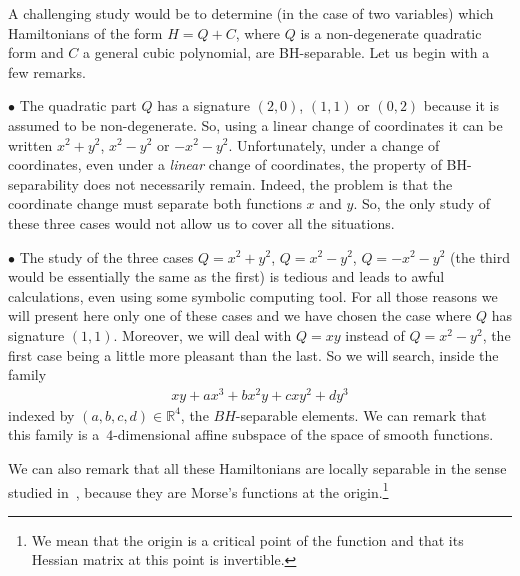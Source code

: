 \documentclass[10pt,a4paper]{amsart}
\numberwithin{equation}{section}
\begin{document}
A challenging study would be to determine (in the case of two variables) which Hamiltonians of the form $H=Q+C$, where $Q$ is a non-degenerate quadratic form and $C$ a general cubic polynomial, are BH-separable.
Let us begin with a few remarks.



$\bullet$ The quadratic part $Q$ has a signature $(2,0)$, $(1,1)$ or $(0,2)$ because it is assumed to be non-degenerate. So, using a linear change of coordinates it can be written $x^2+y^2$, $x^2-y^2$ or $-x^2-y^2$. Unfortunately, under a change of coordinates, even under a {\it linear} change of coordinates, the property of BH-separability does not necessarily remain. Indeed, the problem is that the coordinate change must separate both functions $x$ and $y$. So, the only study of these three cases would not allow us to cover all the situations.

$\bullet$ The study of the three cases $Q=x^2+y^2$, $Q=x^2-y^2$, $Q=-x^2-y^2$ (the third would be essentially the same as the first) is tedious and leads to awful calculations, even using some symbolic computing tool. For all those reasons we will present here only one of these cases and we have chosen the case where $Q$ has signature $(1,1)$. Moreover, we will deal with $Q=xy$ instead of $Q=x^2-y^2$, the first case being a little more pleasant than the last.
So we will search, inside the family
\begin{gather*}
xy+ax^3+bx^2y+cxy^2+dy^3
\end{gather*}
indexed by $(a,b,c,d)\in\mathbb{R}^4$,
the $BH$-separable elements. We can remark that this family is a~$4$-dimensional affine subspace of the space of smooth functions.

We can also remark that all these Hamiltonians are locally separable in the sense studied in~\cite{BouBr}, because they are Morse's functions at the origin.\footnote{We mean that the origin is a critical point of the function and that its Hessian matrix at this point is invertible.}
\end{document}
